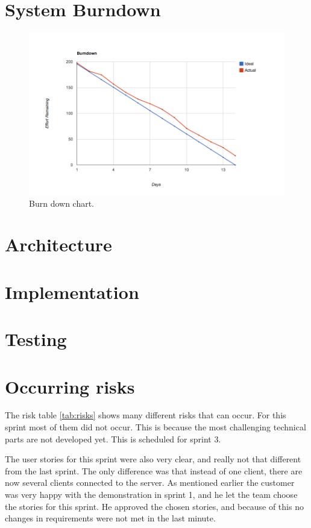 \section{System Burndown}
\begin{figure}[H]
	\centering
		\includegraphics[width=18cm]{sprint2/BurndownSprint2.png}
	\caption{Burn down chart.}
	\label{fig:Burn2 }
\end{figure}

\section{Architecture}
\section{Implementation}
\section{Testing}
\section{Occurring risks}

The risk table \ref{tab:risks} shows many different risks that can occur. 
For this sprint most of them did not occur. 
This is because the most challenging technical parts are not developed yet. 
This is scheduled for sprint 3. 

The user stories for this sprint were also very clear, and really not that different from the last sprint. 
The only difference was that instead of one client, there are now several clients connected to the server. 
As mentioned earlier the customer was very happy with the demonstration in sprint 1, and he let the team choose the stories for this sprint. 
He approved the chosen stories, and because of this no changes in requirements were not met in the last minute.
 
